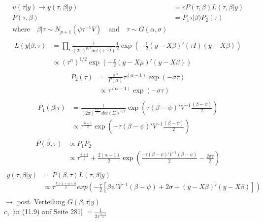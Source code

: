 \documentclass{article}
\begin{document}
\begin{align*}
u(\tau | y) \rightarrow y(\tau, \beta |y) &= cP(\tau, \beta) L(\tau, \beta| y)\\
P(\tau, \beta) &= P_1 \tau|\beta) P_2(\tau)\\
\text{where} \quad \beta|\tau \sim N_{p+1}(\psi \tau^{-1} V) \quad \text{and} \quad
\tau \sim G(\alpha, \sigma)\\
\end{align*}
\begin{align*}
L(y|\beta, \tau) &= \prod_i \frac{1}{(2 \pi)^{p/2} det(\tau^{-1}I)} \frac{1}{2} \exp(-\frac{1}{2}(y-X\beta)' (\tau I) (y-X\beta))\\
&\propto (\tau^n)^{1/2} \exp(-\frac{\tau}{2}(y-X\mu)'  (y-X\beta))\\
\end{align*}
\begin{align*}
P_2(\tau) &= \frac{\sigma^\alpha}{\Gamma(\alpha)} \tau^{(\alpha-1)} \exp(-\sigma \tau)\\ 
&\propto  \tau^{(\alpha-1)} \exp(-\sigma \tau)\\
\end{align*}
\begin{align*}
P_1(\beta|\tau) &= \frac{1}{(2 \pi)^{\frac{k+1}{2}} det(\Sigma)^{1/2}} 
\exp(\tau (\beta-\psi)' V^{-1} \frac{(\beta-\psi)}{2})\\
&\propto \tau^{\frac{k+1}{2}}\exp(-\tau (\beta-\psi)' V^{-1} \frac{(\beta-\psi)}{2})\\
\end{align*}
\begin{align*}
P(\beta, \tau) &\propto P_1 P_2\\
&\propto \tau^{\frac{k+1}{2}} + \frac{2(\alpha-1)}{2} \exp(\frac{-\tau(\beta-\psi)'V^{-1}(\beta-\psi)}{2}-\frac{2 \sigma \tau}{2})\\
\end{align*}
\begin{align*}
y(\tau,\beta|y)&=P(\beta,\tau)L(\tau,\beta|y)\\
&\propto \tau^{\frac{k+1+\alpha+n}{2}}exp(-\frac{\tau}{2}[\beta \psi'V^{-1}(\beta-\psi)+2 \sigma + (y-X\beta)'(y-X\beta)])\\
\end{align*}
$\rightarrow$ post. Verteilung $G(\beta, \tau|y)$\\

$c_1$ [in (11.9) auf Seite 281] $=\frac{1}{2 \pi^{\frac{k+1}{2}}}$\\
\end{document}
